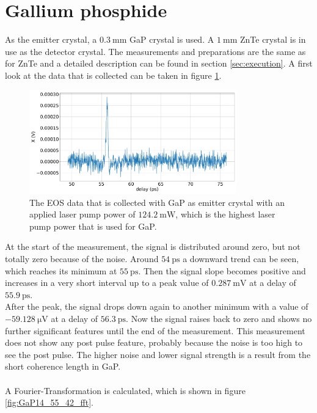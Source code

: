 \section{Gallium phosphide}
As the emitter crystal, a $\SI{0.3}{\milli\meter}$ GaP crystal is used.
A $\SI{1}{\milli\meter}$ ZnTe crystal is in use as the detector crystal.
The measurements and preparations are the same as for ZnTe and a detailed description can be found in section \ref{sec:execution}.
A first look at the data that is collected can be taken in figure \ref{fig:GaP14_55_42normalX}.\FloatBarrier
\begin{figure}
    \centering
    \includegraphics[width=0.8\textwidth]{Plots/GaP14_55_42normalX.pdf}
    \caption{The EOS data that is collected with GaP as emitter crystal with an applied laser pump power of $\SI{124.2}{\milli\W}$, which is the highest laser pump power that is used for GaP.}
    \label{fig:GaP14_55_42normalX}
\end{figure}\FloatBarrier
At the start of the measurement, the signal is distributed around zero, but not totally zero because of the noise.
Around $\SI{54}{\pico\second}$ a downward trend can be seen, which reaches its minimum at $\SI{55}{\pico\second}$.
Then the signal slope becomes positive and increases in a very short interval up to a peak value of $\SI{0.287}{\milli\V}$ at a delay of $\SI{55.9}{\pico\second}$.
\\
After the peak, the signal drops down again to another minimum with a value of $\SI{-59.128}{\micro\V}$ at a delay of $\SI{56.3}{\pico\second}$.
Now the signal raises back to zero and shows no further significant features until the end of the measurement.
This measurement does not show any post pulse feature, probably because the noise is too high to see the post pulse.
The higher noise and lower signal strength is a result from the short coherence length in GaP.
\\\\
A Fourier-Transformation is calculated, which is shown in figure \ref{fig:GaP14_55_42_fft}.
